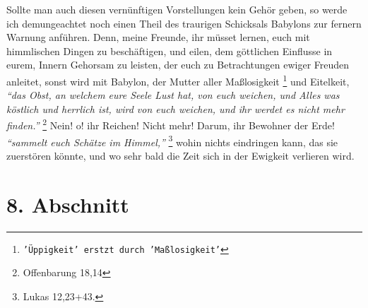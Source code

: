 \medskip

Sollte man auch diesen vernünftigen Vorstellungen kein Gehör geben, so werde ich
demungeachtet noch einen Theil des traurigen Schicksals Babylons zur fernern
Warnung anführen. Denn, meine Freunde, ihr müsset lernen, euch mit himmlischen
Dingen zu beschäftigen, und eilen, dem göttlichen Einflusse in eurem, Innern
Gehorsam zu leisten, der euch zu Betrachtungen ewiger Freuden anleitet, sonst
wird mit Babylon, der Mutter aller Maßlosigkeit
\footnote{\texttt{'Üppigkeit' erstzt durch 'Maßlosigkeit'}} und Eitelkeit,
\textit{"`das Obst, an
welchem eure Seele Lust hat, von euch weichen, und Alles was köstlich und
herrlich ist, wird von euch weichen, und ihr werdet es nicht mehr
finden."'}
\footnote{Offenbarung 18,14}
Nein! o! ihr Reichen! Nicht mehr! Darum, ihr
Bewohner der Erde!
\textit{"`sammelt euch Schätze im Himmel,"'}
\footnote{Lukas 12,23+43.}
wohin nichts eindringen kann, das sie zuerstören könnte, und wo sehr bald die
Zeit sich in der Ewigkeit verlieren wird.

\section{8. Abschnitt} \label{kap18_ab8}

